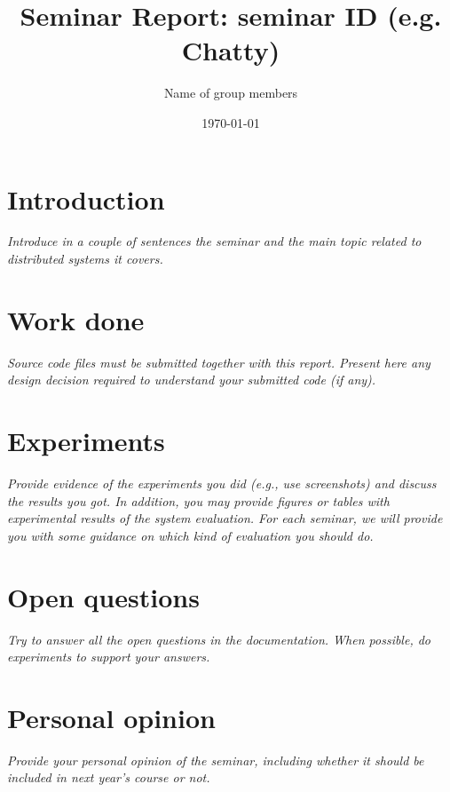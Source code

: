 \documentclass[a4paper, 11pt]{article}
\title{Seminar Report: seminar ID (e.g. Chatty)}
\author{Name of group members}
\date{\today{}}
\begin{document}
\maketitle

\section{Introduction}

\textit{Introduce in a couple of sentences the seminar and the main topic related to distributed systems it covers.}

\section{Work done}

\textit{Source code files must be submitted together with this report. Present here any design decision required to understand your submitted code (if any).}

\section{Experiments}

\textit{Provide evidence of the experiments you did (e.g., use screenshots) and discuss the results you got. In addition, you may provide figures or tables with experimental results of the system evaluation. For each seminar, we will provide you with some guidance on which kind of evaluation you should do.}

\section{Open questions}

\textit{Try to answer all the open questions in the documentation. When possible, do experiments to support your answers.}

\section{Personal opinion}

\textit{Provide your personal opinion of the seminar, including whether it should be included in next year's course or not.}
\end{document}
